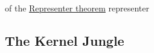 \documentclass{article}
\begin{document}
\begin{Proof}{of the \hyperref[thm:representer]{Representer theorem}}
  {representer}

  
\end{Proof}

\subsection{The Kernel Jungle}

\begin{Proof}{}{}
  
\end{Proof}
\end{document}
